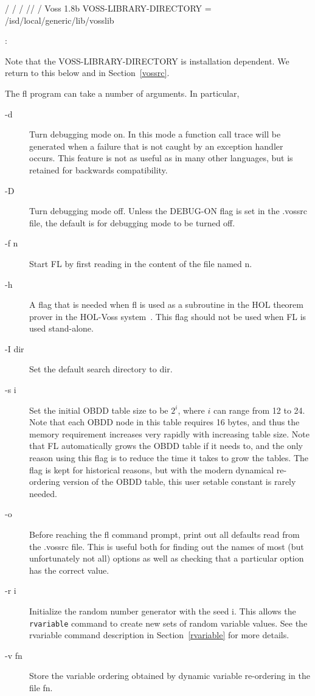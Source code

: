 \begin{hol}
      /\verb@\@
     /  \verb@\@/\verb@\@
 /\verb@\@ /      \verb@\@
/  Voss 1.8b\verb@\@
VOSS-LIBRARY-DIRECTORY = /isd/local/generic/lib/vosslib

:
\end{hol}
Note that the VOSS-LIBRARY-DIRECTORY%
%
{} is installation dependent.
We return to this below and in Section~\ref{vossrc}.

The fl program can take a number of arguments.
In particular, 
\begin{description}
\item[-d]
Turn debugging mode%
%
{} on.
In this mode a function call trace%
%
{} will be generated
when a failure that is not caught by an exception handler occurs.
This feature is not as useful as in many other languages, but
is retained for backwards compatibility.
\item[-D]
Turn debugging mode off.
Unless the DEBUG-ON flag is set in the .vossrc file, the default
is for debugging mode to be turned off.
\item[-f n]
Start FL by first reading in the content of the file named n.
\item[-h]
A flag that is needed when fl is used as a subroutine in the
HOL%
%
{} theorem prover in the HOL-Voss%
%
{}
system~\cite{JoyceSegerDAC,SegerJoyceTwoLevel}.
This flag should not be used when FL is used stand-alone.
\item[-I dir]
Set the default search directory%
%
{} to dir.
\item[-s i]
Set the initial OBDD table size to be $2^i$, where $i$ can range
from 12 to 24.
Note that each OBDD node in this table requires 16 bytes, and thus
the memory requirement increases very rapidly with increasing table size.
Note that FL automatically grows the OBDD table if it needs to, and
the only reason using this flag is to reduce the time it takes
to grow the tables.
The flag is kept for historical reasons, but with the modern
dynamical re-ordering version of the OBDD table, this user setable
constant is rarely needed.
\item[-o]
Before reaching the fl command prompt, print out all defaults
read from the .vossrc%
%
{} file.
This is useful both for finding out the names of most (but unfortunately
not all) options%
%
{} as well as checking that a particular option
has the correct value.
\item[-r i]
Initialize the random number%
%
{} generator with the seed i.
This allows the {\tt rvariable}
%
{} command to create new sets
of random variable values.
See the rvariable command description in Section~\ref{rvariable} for
more details.
\item[-v fn]
Store the variable ordering obtained by dynamic variable re-ordering%
%
{}
in the file fn.
\end{description}

